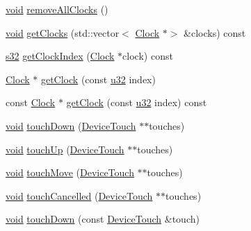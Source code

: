 \begin{DoxyCompactItemize}
\item 
\mbox{\hyperlink{_thread_8h_af1e856da2e658414cb2456cb6f7ebc66}{void}} \mbox{\hyperlink{classnjli_1_1_scene_a245ec2b188fb22f97e58d2bbca676424}{remove\+All\+Clocks}} ()
\item 
\mbox{\hyperlink{_thread_8h_af1e856da2e658414cb2456cb6f7ebc66}{void}} \mbox{\hyperlink{classnjli_1_1_scene_a3a97afacd1d6a151b0405788ed5b8b63}{get\+Clocks}} (std\+::vector$<$ \mbox{\hyperlink{classnjli_1_1_clock}{Clock}} $\ast$$>$ \&clocks) const
\item 
\mbox{\hyperlink{_util_8h_aa62c75d314a0d1f37f79c4b73b2292e2}{s32}} \mbox{\hyperlink{classnjli_1_1_scene_a7988c5db188ad35b0a4d474ea493e611}{get\+Clock\+Index}} (\mbox{\hyperlink{classnjli_1_1_clock}{Clock}} $\ast$clock) const
\item 
\mbox{\hyperlink{classnjli_1_1_clock}{Clock}} $\ast$ \mbox{\hyperlink{classnjli_1_1_scene_a825e7bfa517703751e9263464b220911}{get\+Clock}} (const \mbox{\hyperlink{_util_8h_a10e94b422ef0c20dcdec20d31a1f5049}{u32}} index)
\item 
const \mbox{\hyperlink{classnjli_1_1_clock}{Clock}} $\ast$ \mbox{\hyperlink{classnjli_1_1_scene_ae03ad36c1fa1f906ad9affb26f03e519}{get\+Clock}} (const \mbox{\hyperlink{_util_8h_a10e94b422ef0c20dcdec20d31a1f5049}{u32}} index) const
\item 
\mbox{\hyperlink{_thread_8h_af1e856da2e658414cb2456cb6f7ebc66}{void}} \mbox{\hyperlink{classnjli_1_1_scene_ac843c56be80b5c13c602cb324f38fc65}{touch\+Down}} (\mbox{\hyperlink{classnjli_1_1_device_touch}{Device\+Touch}} $\ast$$\ast$touches)
\item 
\mbox{\hyperlink{_thread_8h_af1e856da2e658414cb2456cb6f7ebc66}{void}} \mbox{\hyperlink{classnjli_1_1_scene_a292488e27e7feeccb28d36f827cff719}{touch\+Up}} (\mbox{\hyperlink{classnjli_1_1_device_touch}{Device\+Touch}} $\ast$$\ast$touches)
\item 
\mbox{\hyperlink{_thread_8h_af1e856da2e658414cb2456cb6f7ebc66}{void}} \mbox{\hyperlink{classnjli_1_1_scene_a8e22ab9072c414608daa632c3cff9c96}{touch\+Move}} (\mbox{\hyperlink{classnjli_1_1_device_touch}{Device\+Touch}} $\ast$$\ast$touches)
\item 
\mbox{\hyperlink{_thread_8h_af1e856da2e658414cb2456cb6f7ebc66}{void}} \mbox{\hyperlink{classnjli_1_1_scene_adfa4d5941916d1716d9015a22a5976dc}{touch\+Cancelled}} (\mbox{\hyperlink{classnjli_1_1_device_touch}{Device\+Touch}} $\ast$$\ast$touches)
\item 
\mbox{\hyperlink{_thread_8h_af1e856da2e658414cb2456cb6f7ebc66}{void}} \mbox{\hyperlink{classnjli_1_1_scene_af38110449fc118d5656bb95ff8885ccb}{touch\+Down}} (const \mbox{\hyperlink{classnjli_1_1_device_touch}{Device\+Touch}} \&touch)
$$
\end{DoxyCompactItemize}
